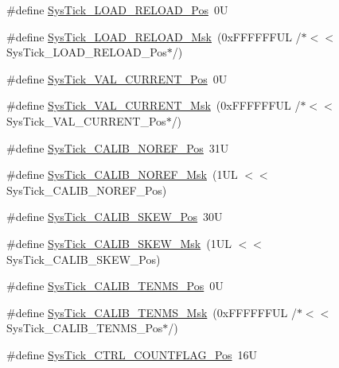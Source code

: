 \begin{DoxyCompactItemize}
\item 
\#define \hyperlink{group___c_m_s_i_s___sys_tick_gaf44d10df359dc5bf5752b0894ae3bad2}{Sys\+Tick\+\_\+\+L\+O\+A\+D\+\_\+\+R\+E\+L\+O\+A\+D\+\_\+\+Pos}~0U
\item 
\#define \hyperlink{group___c_m_s_i_s___sys_tick_ga265912a7962f0e1abd170336e579b1b1}{Sys\+Tick\+\_\+\+L\+O\+A\+D\+\_\+\+R\+E\+L\+O\+A\+D\+\_\+\+Msk}~(0x\+F\+F\+F\+F\+F\+F\+U\+L /$\ast$$<$$<$ Sys\+Tick\+\_\+\+L\+O\+A\+D\+\_\+\+R\+E\+L\+O\+A\+D\+\_\+\+Pos$\ast$/)
\item 
\#define \hyperlink{group___c_m_s_i_s___sys_tick_ga3208104c3b019b5de35ae8c21d5c34dd}{Sys\+Tick\+\_\+\+V\+A\+L\+\_\+\+C\+U\+R\+R\+E\+N\+T\+\_\+\+Pos}~0U
\item 
\#define \hyperlink{group___c_m_s_i_s___sys_tick_gafc77b56d568930b49a2474debc75ab45}{Sys\+Tick\+\_\+\+V\+A\+L\+\_\+\+C\+U\+R\+R\+E\+N\+T\+\_\+\+Msk}~(0x\+F\+F\+F\+F\+F\+F\+U\+L /$\ast$$<$$<$ Sys\+Tick\+\_\+\+V\+A\+L\+\_\+\+C\+U\+R\+R\+E\+N\+T\+\_\+\+Pos$\ast$/)
\item 
\#define \hyperlink{group___c_m_s_i_s___sys_tick_ga534dbe414e7a46a6ce4c1eca1fbff409}{Sys\+Tick\+\_\+\+C\+A\+L\+I\+B\+\_\+\+N\+O\+R\+E\+F\+\_\+\+Pos}~31U
\item 
\#define \hyperlink{group___c_m_s_i_s___sys_tick_ga3af0d891fdd99bcc8d8912d37830edb6}{Sys\+Tick\+\_\+\+C\+A\+L\+I\+B\+\_\+\+N\+O\+R\+E\+F\+\_\+\+Msk}~(1\+U\+L $<$$<$ Sys\+Tick\+\_\+\+C\+A\+L\+I\+B\+\_\+\+N\+O\+R\+E\+F\+\_\+\+Pos)
\item 
\#define \hyperlink{group___c_m_s_i_s___sys_tick_gadd0c9cd6641b9f6a0c618e7982954860}{Sys\+Tick\+\_\+\+C\+A\+L\+I\+B\+\_\+\+S\+K\+E\+W\+\_\+\+Pos}~30U
\item 
\#define \hyperlink{group___c_m_s_i_s___sys_tick_ga8a6a85a87334776f33d77fd147587431}{Sys\+Tick\+\_\+\+C\+A\+L\+I\+B\+\_\+\+S\+K\+E\+W\+\_\+\+Msk}~(1\+U\+L $<$$<$ Sys\+Tick\+\_\+\+C\+A\+L\+I\+B\+\_\+\+S\+K\+E\+W\+\_\+\+Pos)
\item 
\#define \hyperlink{group___c_m_s_i_s___sys_tick_gacae558f6e75a0bed5d826f606d8e695e}{Sys\+Tick\+\_\+\+C\+A\+L\+I\+B\+\_\+\+T\+E\+N\+M\+S\+\_\+\+Pos}~0U
\item 
\#define \hyperlink{group___c_m_s_i_s___sys_tick_gaf1e68865c5aece2ad58971225bd3e95e}{Sys\+Tick\+\_\+\+C\+A\+L\+I\+B\+\_\+\+T\+E\+N\+M\+S\+\_\+\+Msk}~(0x\+F\+F\+F\+F\+F\+F\+U\+L /$\ast$$<$$<$ Sys\+Tick\+\_\+\+C\+A\+L\+I\+B\+\_\+\+T\+E\+N\+M\+S\+\_\+\+Pos$\ast$/)
\item 
\#define \hyperlink{group___c_m_s_i_s___sys_tick_gadbb65d4a815759649db41df216ed4d60}{Sys\+Tick\+\_\+\+C\+T\+R\+L\+\_\+\+C\+O\+U\+N\+T\+F\+L\+A\+G\+\_\+\+Pos}~16U

\end{DoxyCompactItemize}
